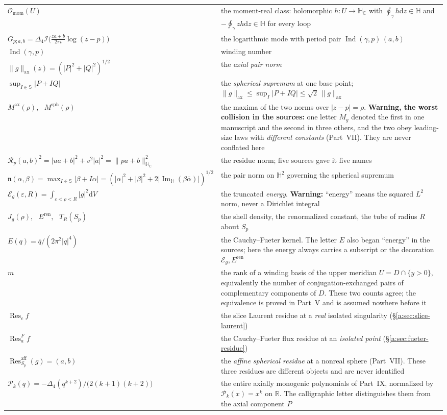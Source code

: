 \documentclass[11pt,a4paper]{article}
\numberwithin{equation}{section}
\theoremstyle{definition}
\theoremstyle{remark}
\theoremstyle{plain}
\newcommand{\HH}{\mathbb H}
\newcommand{\HC}{\mathbb H_{\mathbb C}}
\newcommand{\RR}{\mathbb R}
\newcommand{\SSS}{\mathbb S}
\DeclareMathOperator{\Ind}{Ind}
\DeclareMathOperator{\Ima}{Im}
\newcommand{\ImH}{\Ima_{\HH}}
\newcommand{\lap}{\Delta_4}
\newcommand{\I}{\mathcal I}
\newcommand{\Omom}{\mathcal O_{\mathrm{mom}}}
\newcommand{\Sp}{S_{p}}
\newcommand{\Rp}{\mathcal R_{p}}      %
\newcommand{\nn}{\mathfrak n}         %
\newcommand{\axn}[1]{\lVert #1\rVert_{\mathrm{ax}}}   %
\newcommand{\Msph}{M^{\mathrm{sph}}}                  %
\newcommand{\Max}{M^{\mathrm{ax}}}                    %
\newcommand{\Eg}{\mathcal E_{g}}
\newcommand{\Jg}{J_{g}}
\newcommand{\Eren}{E^{\mathrm{ren}}}
\newcommand{\Tube}{T}
\newcommand{\abs}[1]{\lvert #1\rvert}
\newcommand{\norm}[1]{\lVert #1\rVert}
\newcommand{\dd}{\mathrm d}
\newcommand{\Res}{\operatorname{Res}}
\newcommand{\Resaff}{\operatorname{Res}^{\mathrm{aff}}}
\begin{document}
{\begin{longtable}{@{}p{}p{}@{}}
$\Omom(U)$ & the moment-real class: holomorphic $h:U\to\HC$ with
 $\oint_\gamma h\dd z\in\HH$ and $-\oint_\gamma zh\dd z\in\HH$ for every loop\\
$G_{p;a,b}=\lap\I\bigl(\tfrac{za+b}{2\pi\iota}\log(z-p)\bigr)$ & the
 logarithmic mode with period pair $\Ind(\gamma,p)\,(a,b)$\\
$\Ind(\gamma,p)$ & winding number\\
$\axn{g}(z)=(\abs P^2+\abs Q^2)^{1/2}$ & the \emph{axial pair norm}\\
$\sup_{I\in\SSS}\abs{P+IQ}$ & the \emph{spherical supremum} at one base point;
 $\axn g\le\sup_I\abs{P+IQ}\le\sqrt2\,\axn g$\\
$\Max(\rho)$, \ $\Msph(\rho)$ & the maxima of the two norms over
 $\abs{z-p}=\rho$. \textbf{Warning, the worst collision in the sources:} one
 letter $M_g$ denoted the first in one manuscript and the second in three
 others, and the two obey leading-size laws with \emph{different constants}
 (Part~VII). They are never conflated here\\
$\Rp(a,b)^2=\abs{ua+b}^2+v^2\abs a^2=\norm{pa+b}_{\HC}^2$ & the residue norm;
 five sources gave it five names\\
$\nn(\alpha,\beta)=\max_{I\in\SSS}\abs{\beta+I\alpha}
 =(\abs\alpha^2+\abs\beta^2+2\abs{\ImH(\beta\bar\alpha)})^{1/2}$ & the pair
 norm on $\HH^2$ governing the spherical supremum\\
$\Eg(\varepsilon,R)=\int_{\varepsilon<\rho<R}\abs g^2\dd V$ & the truncated
 \emph{energy}. \textbf{Warning:} ``energy'' means the squared $L^2$ norm,
 never a Dirichlet integral\\
$\Jg(\rho)$, \ $\Eren$, \ $\Tube_R(\Sp)$ & the shell density, the
 renormalized constant, the tube of radius $R$ about $\Sp$\\
$E(q)=\bar q/(2\pi^2\abs q^4)$ & the Cauchy--Fueter kernel. The letter $E$
 also began ``energy'' in the sources; here the energy always carries a
 subscript or the decoration $\Eg,\Eren$\\
$m$ & the rank of a winding basis of the upper meridian
 $U=D\cap\{y>0\}$, equivalently the number of conjugation-exchanged pairs of
 complementary components of $D$. These two counts agree; the equivalence is
 proved in Part~V and is assumed nowhere before it\\
$\Res_c f$ & the slice Laurent residue at a \emph{real} isolated singularity
 (\S\ref{a:sec:slice-laurent})\\
$\Res^{F}_a f$ & the Cauchy--Fueter flux residue at an \emph{isolated point}
 (\S\ref{a:sec:fueter-residue})\\
$\Resaff_{\Sp}(g)=(a,b)$ & the \emph{affine spherical residue} at a nonreal
 sphere (Part~VII). These three residues are different objects and are never
 identified\\
$\mathcal P_k(q)=-\lap(q^{k+2})/\bigl(2(k+1)(k+2)\bigr)$ & the entire axially
 monogenic polynomials of Part~IX, normalized by
 $\mathcal P_k(x)=x^k$ on $\RR$. The calligraphic letter distinguishes them
 from the axial component $P$\\
\bottomrule
\end{longtable}}
\end{document}
